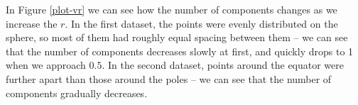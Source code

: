 \documentclass[a4paper, 12pt]{article}
\begin{document}
In Figure \ref{plot-vr} we can see how the number of components changes as we increase the $r$. 
In the first dataset, the points were evenly distributed on the sphere, so most of them had roughly equal spacing between them -- we can see that the number of components decreases slowly at first, and quickly drops to 1 when we approach $0.5$. 
In the second dataset, points around the equator were further apart than those around the poles -- we can see that the number of components gradually decreases.

\begin{figure}[H]
        \centering
\end{figure}
\end{document}
